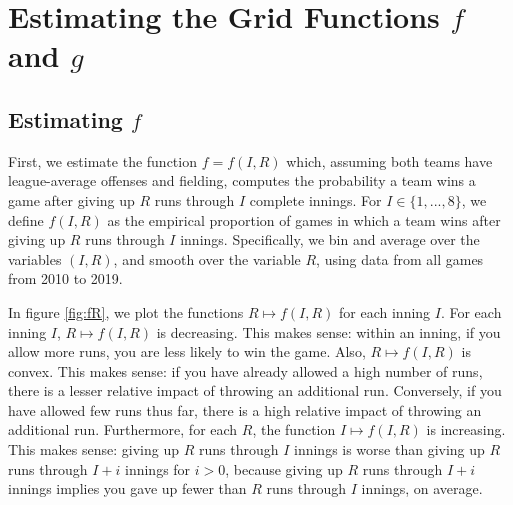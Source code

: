 \documentclass[12pt]{article}
\begin{document}
\section{Estimating the Grid Functions $f$ and $g$}

\subsection{Estimating $f$}

First, we estimate the function $f=f(I,R)$ which, assuming both teams have league-average offenses and fielding, computes the probability a team wins a game after giving up $R$ runs through $I$ complete innings. For $I \in \{1,...,8\}$, we define $f(I,R)$ as the empirical proportion of games in which a team wins after giving up $R$ runs through $I$ innings. Specifically, we bin and average over the variables $(I,R)$, and smooth over the variable $R$, using data from all games from 2010 to 2019. 

In figure \ref{fig:fR}, we plot the functions $R \mapsto f(I,R)$ for each inning $I$. For each inning $I$, $R \mapsto f(I,R)$ is decreasing. This makes sense: within an inning, if you allow more runs, you are less likely to win the game. Also, $R \mapsto f(I,R)$ is convex. This makes sense: if you have already allowed a high number of runs, there is a lesser relative impact of throwing an additional run. Conversely, if you have allowed few runs thus far, there is a high relative impact of throwing an additional run. Furthermore, for each $R$, the function $I \mapsto f(I,R)$ is increasing. This makes sense: giving up $R$ runs through $I$ innings is worse than giving up $R$ runs through $I+i$ innings for $i > 0$, because giving up $R$ runs through $I+i$ innings implies you gave up fewer than $R$ runs through $I$ innings, on average.
\end{document}
